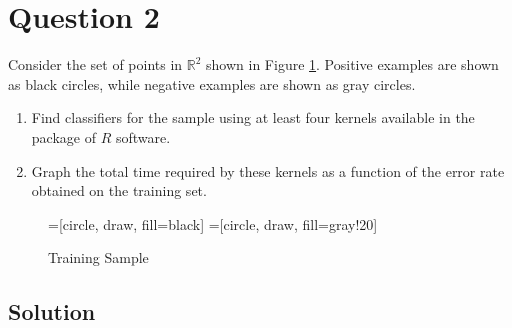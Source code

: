 
\section*{Question 2}

Consider the set of points in $\mathbb{R}^2$ shown in Figure \ref{fig1}.
Positive examples are shown as black circles, while negative examples are shown as gray circles.
\begin{enumerate}[label=(\alph*)]
\item Find classifiers for the sample using at least four kernels available in the package of $R$ software.
\item Graph the total time required by these kernels as a function of the error rate obtained on the training set.
\end{enumerate}

\begin{figure}[H]\centering
{}=[circle, draw, fill=black]
=[circle, draw, fill=gray!20]
\caption{Training Sample}\label{fig1}
\end{figure}

\vfill

\subsection*{Solution}

